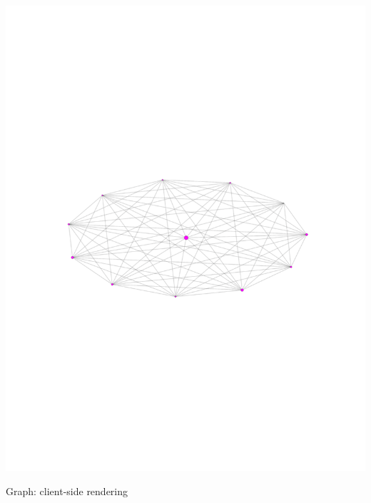 \documentclass[landscape,paperwidth=70in,paperheight=46in,fontscale=0.225]{baposter} %
\begin{document}
\begin{poster}
{\begin{minipage}{0.3\linewidth}
\includegraphics[scale=0.3]{figures/graph_community.pdf} 
\end{minipage}
\hfill
\begin{minipage}{0.3\linewidth}

Graph:  client-side rendering


\end{minipage}}
\end{poster}
\end{document}
